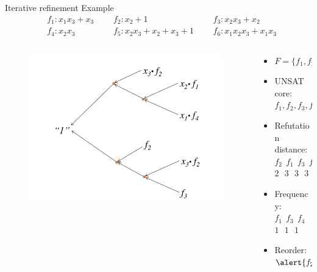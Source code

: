 \documentclass[xcolor=dvipsnames]{beamer}
\newcommand{\bi}{\begin{itemize}}
\newcommand{\ei}{\end{itemize}}
\begin{document}
\begin{frame}{\large{Iterative refinement Example}}
\vspace{-0.1in}
\begin{alignat*}{4}
& f_1: x_1x_3+x_3 && ~~~f_2: x_2 + 1 && ~~~f_3: x_2x_3+x_2 \\
& f_4: x_2x_3 && ~~~f_5: x_2x_3 + x_2 + x_3 + 1 && ~~~f_6 : x_1x_2x_3 +x_1x_3
\end{alignat*}
\vspace{-0.5in}
\begin{columns}[onlytextwidth]
\begin{column}{0.6\textwidth}
\begin{figure}
\centering
\includegraphics[scale=0.3]{iterative_1.pdf}
\end{figure}
\end{column}
\begin{column}{0.4\textwidth}
\bi
\item $F=\{f_1,f_2,\dots,f_6\}\in\mathbb{F}_2[x_1,x_2,x_3]$
\item UNSAT core: $f_1,f_2,f_3,f_4$
\item \alert{Refutation distance}: \\
		$f_2~~f_1~~f_3~~f_4$\\
		$2~~~3~~~3~~~3$
\item \alert{Frequency}:\\
		$f_1~~f_3~~f_4$\\
		$1~~~1~~~1$
\item Reorder: $\alert{f_2},f_1,f_3,f_4$
\ei
\end{column}
\end{columns}
\end{frame}
\end{document}

